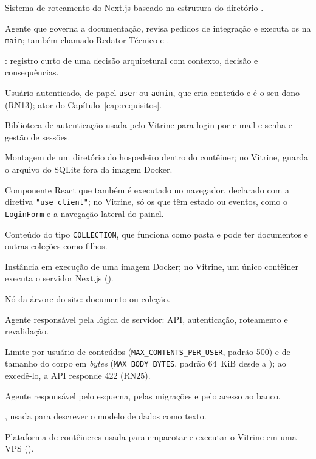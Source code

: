 \begin{description}[style=nextline, leftmargin=0.6cm, itemsep=4pt]
  \item[App Router] Sistema de roteamento do Next.js baseado na estrutura do diretório .
  \item[Arquiteto] Agente que governa a documentação, revisa pedidos de integração e executa os  na \texttt{main}; também chamado Redator Técnico e .
  \item[ADR] : registro curto de uma decisão arquitetural com contexto, decisão e consequências.
  \item[Autor] Usuário autenticado, de papel \texttt{user} ou \texttt{admin}, que cria conteúdo e é o seu dono (RN13); ator do Capítulo~\ref{cap:requisitos}.
  \item[better-auth] Biblioteca de autenticação usada pelo Vitrine para login por e-mail e senha e gestão de sessões.
  \item[\en{Bind mount}] Montagem de um diretório do hospedeiro dentro do contêiner; no Vitrine, guarda o arquivo do SQLite fora da imagem Docker.
  \item[Client Component] Componente React que também é executado no navegador, declarado com a diretiva \texttt{"use client"}; no Vitrine, só os que têm estado ou eventos, como o \texttt{LoginForm} e a navegação lateral do painel.
  \item[Coleção] Conteúdo do tipo \texttt{COLLECTION}, que funciona como pasta e pode ter documentos e outras coleções como filhos.
  \item[Contêiner] Instância em execução de uma imagem Docker; no Vitrine, um único contêiner executa o servidor Next.js ().
  \item[Conteúdo] Nó da árvore do site: documento ou coleção.
  \item[Core] Agente responsável pela lógica de servidor: API, autenticação, roteamento e revalidação.
  \item[Cota] Limite por usuário de conteúdos (\texttt{MAX\_CONTENTS\_PER\_USER}, padrão 500) e de tamanho do corpo em \emph{bytes} (\texttt{MAX\_BODY\_BYTES}, padrão 64~KiB desde a ); ao excedê-lo, a API responde 422  (RN25).
  \item[Dados] Agente responsável pelo esquema, pelas migrações e pelo acesso ao banco.
  \item[DBML] , usada para descrever o modelo de dados como texto.
  \item[Docker] Plataforma de contêineres usada para empacotar e executar o Vitrine em uma VPS ().

\end{description}
